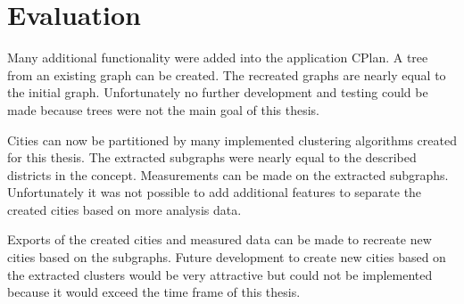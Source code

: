 \chapter{Evaluation}
Many additional functionality were added into the application CPlan. A tree from an existing graph can be created. The recreated graphs are nearly equal to the initial graph. Unfortunately no further development and testing could be made because trees were not the main goal of this thesis.

Cities can now be partitioned by many implemented clustering algorithms created for this thesis. The extracted subgraphs were nearly equal to the described districts in the concept. Measurements can be made on the extracted subgraphs. Unfortunately it was not possible to add additional features to separate the created cities based on more analysis data.

Exports of the created cities and measured data can be made to recreate new cities based on the subgraphs. Future development to create new cities based on the extracted clusters would be very attractive but could not be implemented because it would exceed the time frame of this thesis.
